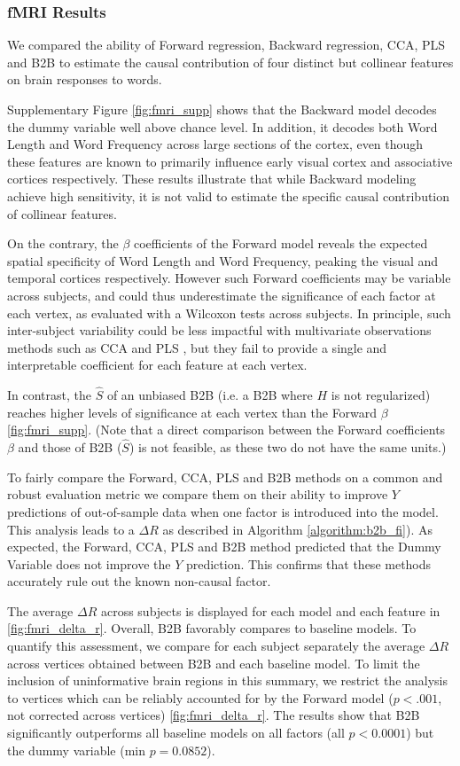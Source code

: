 \subsubsection{fMRI Results}
We compared the ability of Forward regression, Backward regression, CCA, PLS
and B2B to estimate the causal contribution of four distinct but collinear
features on brain responses to words.

Supplementary Figure \ref{fig:fmri_supp} shows that the Backward model decodes
the dummy variable well above chance level. In addition, it decodes both Word
Length and Word Frequency across large sections of the cortex, even though
these features are known to primarily influence early visual cortex and
associative cortices respectively. These results illustrate that while Backward
modeling achieve high sensitivity, it is not valid to estimate the specific
causal contribution of collinear features.

On the contrary, the $\beta$
coefficients of the Forward model reveals the expected spatial specificity of
Word Length and Word Frequency, peaking the visual and temporal cortices
respectively. However such Forward coefficients may be variable across
subjects, and could thus underestimate the significance of each factor at each
vertex, as evaluated with a Wilcoxon tests across subjects. In principle, such
inter-subject variability could be less impactful with
multivariate observations methods such as CCA and PLS \citep{bilenko2016pyrcca,
king2018encoding}, but they fail to provide a single and interpretable coefficient
for each feature at each vertex.

In contrast, the $\hat S$ of an unbiased B2B (i.e. a B2B where $H$ is not
regularized) reaches higher levels of significance at each vertex
than the Forward $\beta$ \ref{fig:fmri_supp}. (Note that a direct
comparison between the Forward coefficients $\beta$ and those of B2B ($\hat S$)
is not feasible, as these two do not have the same units.)

To fairly compare the Forward, CCA, PLS and B2B methods on a common and robust
evaluation metric we compare them on their ability to improve $Y$
predictions of out-of-sample data when one factor is introduced into the model.
This analysis leads to a $\Delta R$ as described in Algorithm
\ref{algorithm:b2b_fi}). As expected, the Forward, CCA, PLS
and B2B method predicted that the Dummy Variable does not improve the $Y$
prediction. This confirms that these methods accurately rule out the known
non-causal factor.

The average $\Delta R$ across subjects is displayed for each model and each
feature in \ref{fig:fmri_delta_r}. Overall, B2B favorably compares to baseline models.
To quantify this assessment, we compare for each subject separately
the average $\Delta R$ across vertices obtained between B2B and each
baseline model. To limit the inclusion of uninformative brain regions in this
summary, we restrict the analysis to vertices which can be reliably accounted
for by the Forward model ($p<.001$, not corrected across vertices)
\ref{fig:fmri_delta_r}. The results show that B2B significantly outperforms all
baseline models on all factors (all $p<0.0001$) but the dummy variable
(min $p=0.0852$).
